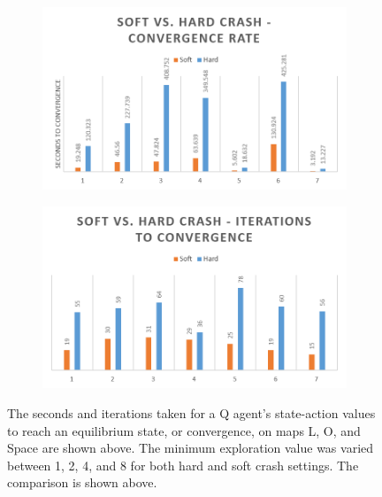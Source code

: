 \documentclass[12pt, letter]{article}
\begin{document}
\begin{figure}[h!] 
    \centering
    \begin{subfigure}[b]{0.48\textwidth}
        \includegraphics[width=1\textwidth]{img/softVhard/VI/Time}
    \end{subfigure}
    \begin{subfigure}[b]{0.48\textwidth}
        \includegraphics[width=1\textwidth]{img/softVhard/VI/Iter}
    \end{subfigure}
    \caption{The seconds and iterations taken for a Q agent's state-action values to reach an equilibrium state, or convergence, on maps L, O, and Space are shown above. The minimum exploration value was varied between 1, 2, 4, and 8 for both hard and soft crash settings.  The comparison is shown above.}
    \label{fig:svhVITimeIter}
\end{figure}
\clearpage
\end{document}
